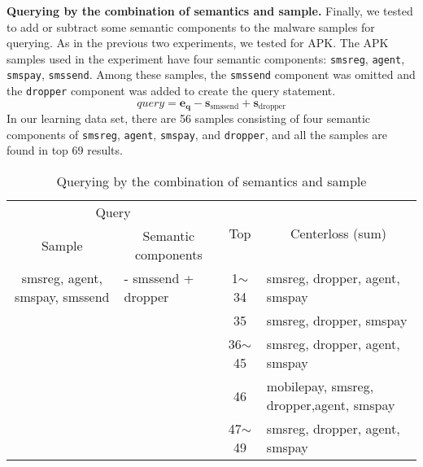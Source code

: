 \textbf{Querying by the combination of semantics and sample. }
Finally, we tested to add or subtract some semantic components to the malware samples for querying. As in the previous two experiments, we tested for APK. The APK samples used in the experiment have four semantic components: \texttt{smsreg}, \texttt{agent}, \texttt{smspay}, \texttt{smssend}. Among these samples, the \texttt{smssend} component was omitted and the \texttt{dropper} component was added to create the query statement.
\[
   query = \mathbf{e_q} - \mathbf{s}_{\text{smssend}} + \mathbf{s}_{\text{dropper}} 
\]
In our learning data set, there are 56 samples consisting of four semantic components of \texttt{smsreg}, \texttt{agent}, \texttt{smspay}, and \texttt{dropper}, and all the samples are found in top 69 results.


\begin{table*}%
\caption{Querying by the combination of semantics and sample}
\label{tab:sample_and_semantics_query_result}
\begin{minipage}{\textwidth}
\begin{center}
\begin{tabular}{llcl}
\hline
\multicolumn{2}{c}{Query}                                                                    & \multirow{2}{*}{Top} & \multicolumn{1}{c}{\multirow{2}{*}{Centerloss (sum)}} \\
\multicolumn{1}{c}{Sample}                         & \multicolumn{1}{c}{Semantic components} &                      & \multicolumn{1}{c}{}                                 \\ \hline
\multicolumn{1}{c}{smsreg, agent, smspay, smssend} & - smssend + dropper                     & 1$\sim$34            & smsreg, dropper, agent, smspay                       \\
                                                   &                                         & 35                   & smsreg, dropper, smspay                              \\
                                                   &                                         & 36$\sim$45           & smsreg, dropper, agent, smspay                       \\
                                                   &                                         & 46                   & mobilepay, smsreg, dropper,agent, smspay             \\
                                                   &                                         & 47$\sim$49           & smsreg, dropper, agent, smspay                       \\

\end{tabular}
\end{center}
\end{minipage}
\end{table*}
